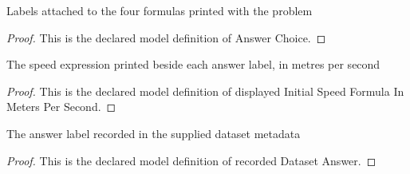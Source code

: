 \begin{definition}
  \label{def:physics:phyx-mini-0815:phyxminiproblems-problemphyxmini0815-answerchoice}
  Labels attached to the four formulas printed with the problem
\end{definition}
\begin{proof}
  This is the declared model definition of Answer Choice.
\end{proof}
\begin{definition}
  \label{def:physics:phyx-mini-0815:phyxminiproblems-problemphyxmini0815-displayedinitialspeedformulainmeterspersecond}
  The speed expression printed beside each answer label, in metres per second
\end{definition}
\begin{proof}
  This is the declared model definition of displayed Initial Speed Formula In Meters Per Second.
\end{proof}
\begin{definition}
  \label{def:physics:phyx-mini-0815:phyxminiproblems-problemphyxmini0815-recordeddatasetanswer}
  The answer label recorded in the supplied dataset metadata
\end{definition}
\begin{proof}
  This is the declared model definition of recorded Dataset Answer.
\end{proof}
